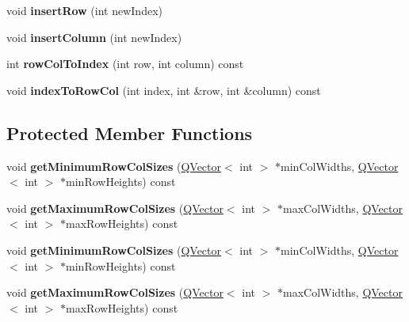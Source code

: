 \begin{DoxyCompactItemize}
void {\bfseries insert\+Row} (int new\+Index)
\item 
\mbox{\label{class_q_c_p_layout_grid_a1e880a321dbe8b43b471ccd764433dc4}} 
void {\bfseries insert\+Column} (int new\+Index)
\item 
\mbox{\label{class_q_c_p_layout_grid_a682ba76f130810ffd294032a1bfbcfcb}} 
int {\bfseries row\+Col\+To\+Index} (int row, int column) const
\item 
\mbox{\label{class_q_c_p_layout_grid_a577223db920e2acb34bc1091080c76d1}} 
void {\bfseries index\+To\+Row\+Col} (int index, int \&row, int \&column) const
\end{DoxyCompactItemize}
\subsection*{Protected Member Functions}
\begin{DoxyCompactItemize}
\item 
\mbox{\label{class_q_c_p_layout_grid_a4b9a251919936f127a63fc1b9911cd4e}} 
void {\bfseries get\+Minimum\+Row\+Col\+Sizes} (\hyperlink{class_q_vector}{Q\+Vector}$<$ int $>$ $\ast$min\+Col\+Widths, \hyperlink{class_q_vector}{Q\+Vector}$<$ int $>$ $\ast$min\+Row\+Heights) const
\item 
\mbox{\label{class_q_c_p_layout_grid_a9be77011ec5b5dfbe7fbda126659e1eb}} 
void {\bfseries get\+Maximum\+Row\+Col\+Sizes} (\hyperlink{class_q_vector}{Q\+Vector}$<$ int $>$ $\ast$max\+Col\+Widths, \hyperlink{class_q_vector}{Q\+Vector}$<$ int $>$ $\ast$max\+Row\+Heights) const
\item 
\mbox{\label{class_q_c_p_layout_grid_a4b9a251919936f127a63fc1b9911cd4e}} 
void {\bfseries get\+Minimum\+Row\+Col\+Sizes} (\hyperlink{class_q_vector}{Q\+Vector}$<$ int $>$ $\ast$min\+Col\+Widths, \hyperlink{class_q_vector}{Q\+Vector}$<$ int $>$ $\ast$min\+Row\+Heights) const
\item 
\mbox{\label{class_q_c_p_layout_grid_a9be77011ec5b5dfbe7fbda126659e1eb}} 
void {\bfseries get\+Maximum\+Row\+Col\+Sizes} (\hyperlink{class_q_vector}{Q\+Vector}$<$ int $>$ $\ast$max\+Col\+Widths, \hyperlink{class_q_vector}{Q\+Vector}$<$ int $>$ $\ast$max\+Row\+Heights) const
\end{DoxyCompactItemize}
